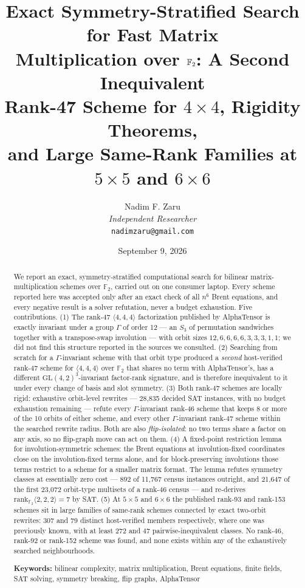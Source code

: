 \documentclass[11pt]{article}
\title{%
  \textbf{Exact Symmetry-Stratified Search for Fast Matrix \\
  Multiplication over $\FF$: A Second Inequivalent \\
  Rank-47 Scheme for $4\times4$, Rigidity Theorems, \\
  and Large Same-Rank Families at $5\times5$ and $6\times6$}
}
\author{
  Nadim F. Zaru \\
  \textit{Independent Researcher} \\
  \texttt{nadimzaru@gmail.com}
}
\date{September 9, 2026}
\newcommand{\FF}{\mathbb{F}_2}
\newcommand{\tw}[3]{\langle #1,#2,#3\rangle}
\newcommand{\GL}{\mathrm{GL}}
\begin{document}
\maketitle

\begin{abstract}
We report an exact, symmetry-stratified computational search for bilinear matrix-multiplication schemes
over $\FF$, carried out on one consumer laptop. Every scheme reported here was accepted only after an
exact check of all $n^6$ Brent equations, and every negative result is a solver refutation, never a
budget exhaustion. Five contributions. (1) The rank-47 $\tw444$ factorization published by AlphaTensor is
exactly invariant under a group $\Gamma$ of order 12 --- an $S_3$ of permutation sandwiches together with a
transpose-swap involution --- with orbit sizes $12,6,6,6,6,3,3,3,1,1$; we did not find this structure
reported in the sources we consulted. (2) Searching from scratch for a $\Gamma$-invariant scheme with that
orbit type produced a \emph{second} host-verified rank-47 scheme for $\tw444$ over $\FF$ that shares no
term with AlphaTensor's, has a different $\GL(4,2)^3$-invariant factor-rank signature, and is therefore
inequivalent to it under every change of basis and slot symmetry. (3) Both rank-47 schemes are locally
rigid: exhaustive orbit-level rewrites --- 28{,}835 decided SAT instances, with no budget exhaustion remaining --- refute
every $\Gamma$-invariant rank-46 scheme that keeps 8 or more of the 10 orbits of either scheme, and every
other $\Gamma$-invariant rank-47 scheme within the searched rewrite radius. Both are also
\emph{flip-isolated}: no two terms share a factor on any axis, so no flip-graph move can act on them. (4) A
fixed-point restriction lemma for involution-symmetric schemes: the Brent equations at involution-fixed
coordinates close on the involution-fixed terms alone, and for block-preserving involutions those terms
restrict to a scheme for a smaller matrix format. The lemma refutes symmetry classes at essentially zero
cost --- 892 of 11{,}767 census instances outright, and 21{,}647 of the first 23{,}072 orbit-type
multisets of a rank-46 census --- and re-derives $\mathrm{rank}_{\FF}\tw222 = 7$ by SAT. (5) At $5\times5$
and $6\times6$ the published rank-93 and rank-153 schemes sit in large families of same-rank schemes
connected by exact two-orbit rewrites: 307 and 79 distinct host-verified members respectively, where one
was previously known, with at least 272 and 47 pairwise-inequivalent classes. No rank-46, rank-92 or
rank-152 scheme was found, and none exists within any of the exhaustively searched neighbourhoods.

\textbf{Keywords:} bilinear complexity, matrix multiplication, Brent equations, finite fields, SAT
solving, symmetry breaking, flip graphs, AlphaTensor
\end{abstract}
\end{document}
